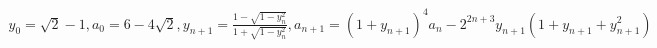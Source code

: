\documentclass[preview]{standalone}
\begin{document}
\begin{align*}
y_0 = \sqrt{2}-1, a_0 = 6-4\sqrt{2}, y_{n+1} = \frac{1-\sqrt{1-y_n^2}}{1+\sqrt{1-y_n^2}}, a_{n+1} = (1+y_{n+1})^4 a_n - 2^{2n+3} y_{n+1} (1+y_{n+1}+y_{n+1}^2)
\end{align*}
\end{document}

